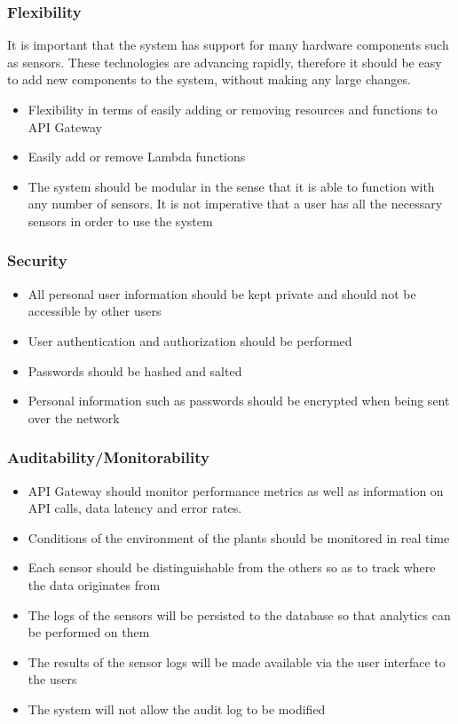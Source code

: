 \documentclass{article}
\begin{document}
		\subsubsection{Flexibility}
			It is important that the system has support for many hardware components such as sensors. These technologies are advancing rapidly, therefore it should be easy to add new components to the system, without making any large changes.
			\begin{itemize}
				\item Flexibility in terms of easily adding or removing resources and functions to API Gateway
				\item Easily add or remove Lambda functions
				\item The system should be modular in the sense that it is able to function with any number of sensors. It is not imperative that a user has all the necessary sensors in order to use the system
			\end{itemize}
		\subsubsection{Security}
			\begin{itemize}
				\item All personal user information should be kept private and should not be accessible by other users
				\item User authentication and authorization should be performed
				\item Passwords should be hashed and salted
				\item Personal information such as passwords should be encrypted when being sent over the network
			\end{itemize}
		\subsubsection{Auditability/Monitorability}
			\begin{itemize}
				\item API Gateway should monitor performance metrics as well as information on API calls, data latency and error rates.
				\item Conditions of the environment of the plants should be monitored in real time
				\item Each sensor should be distinguishable from the others so as to track where the data originates from
				\item The logs of the sensors will be persisted to the database so that analytics can be performed on them
				\item The results of the sensor logs will be made available via the user interface to the users
				\item The system will not allow the audit log to be modified
			\end{itemize}
\end{document}
